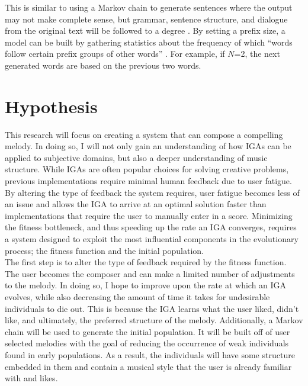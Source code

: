 \documentclass[12pt]{article} %
\begin{document}
This is similar to using a Markov chain to generate sentences where the output may not make complete sense, but grammar, sentence structure, and dialogue from the original text will be followed to a degree \cite{website:rose}. By setting a prefix size, a model can be built by gathering statistics about the frequency of which “words follow certain prefix groups of other words” \cite{website:rose}. For example, if $N$=2, the next generated words are based on the previous two words.

\section{Hypothesis}
This research will focus on creating a system that can compose a compelling melody. In doing so, I will not only gain an understanding of how IGAs can be applied to subjective domains, but also a deeper understanding of music structure. While IGAs are often popular choices for solving creative problems, previous implementations require minimal human feedback due to  user fatigue. By altering the type of feedback the system requires, user fatigue becomes less of an issue and allows the IGA to arrive at an optimal solution faster than implementations that require the user to manually enter in a score. Minimizing the fitness bottleneck, and thus speeding up the rate an IGA converges, requires a system designed to exploit the most influential components in the evolutionary process; the fitness function and the initial population. \\

The first step is to alter the type of feedback required by the fitness function. The user becomes the composer and can make a limited number of adjustments to the melody. In doing so, I hope to improve upon the rate at which an IGA evolves, while also decreasing the amount of time it takes for undesirable individuals to die out. This is because the IGA learns what the user liked, didn't like, and ultimately, the preferred structure of the melody. Additionally, a Markov chain will be used to generate the initial population. It will be built off of user selected melodies with the goal of reducing the occurrence of weak individuals found in early populations. As a result, the individuals will have some structure embedded in them and contain a musical style that the user is already familiar with and likes. \\
\end{document}
